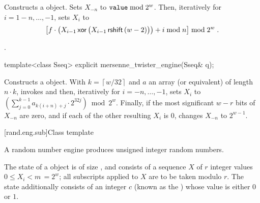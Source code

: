 \begin{itemdescr}
\pnum\effects Constructs a  object.
Sets $X_{-n}$ to $\texttt{value} \bmod 2^w$.
 Then, iteratively for $i = 1\!-\!n,\ldots,-1$,
 sets $X_i$
 to
\[%
 \bigl[f \cdot
       \bigl(X_{i-1} \xor \bigl(X_{i-1} \rightshift (w-2)\bigr)
       \bigr)
       + i \bmod n
 \bigr] \bmod 2^w
\; \mbox{.}
\]%

\pnum\complexity {}.
\end{itemdescr}

%
\begin{itemdecl}
template<class Sseq> explicit mersenne_twister_engine(Sseq& q);
\end{itemdecl}

\begin{itemdescr}
\pnum\effects Constructs a  object.
 With
 $ k = \left\lceil w / 32 \right\rceil $
 and $a$ an array (or equivalent)
 of length $ n \cdot k $,
 invokes 
 and then, iteratively for $i = -n,\ldots,-1$,
 sets $X_i$
 to $ \left(\sum_{j=0}^{k-1}a_{k(i+n)+j} \cdot 2^{32j} \right) \bmod 2^w $.
 Finally,
 if the most significant $w-r$ bits of $X_{-n}$
 are zero,
 and if each of the other resulting $X_i$ is $0$,
 changes $X_{-n}$
 to $ 2^{w-1} $.
\end{itemdescr}


[rand.eng.sub]{Class template }%
%

\pnum
A  random number engine
produces unsigned integer random numbers.

\pnum
The state%
%
of a  object 
is of size
,
and consists of
a sequence $X$ of $r$ integer values $0 \leq X_i < m \,= 2^w$;
all subscripts applied to $X$ are to be taken modulo $r$.
The state 
additionally consists of an integer $c$
(known as the )%
%
whose value is either $0$ or $1$.

